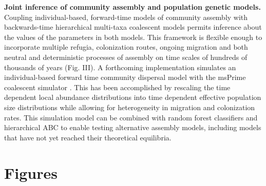 \documentclass[12pt]{article}
\begin{document}
{\begin{minipage}{0.97\textwidth}
    {\bf Joint inference of community assembly and population genetic
      models.} Coupling individual-based, forward-time models of
    community assembly with backwards-time hierarchical multi-taxa
    coalescent models permits inference about the values of the
    parameters in both models. This framework is flexible enough to
    incorporate multiple refugia, colonization routes, ongoing
    migration and both neutral and deterministic processes of assembly
    on time scales of hundreds of thousands of years (Fig. III). A
    forthcoming implementation \citep[gimmeSAD$\pi$][]{overcast}
    simulates an individual-based forward time community dispersal
    model \citep{rosindel} with the msPrime coalescent simulator
    \citep{msPrime}. This has been accomplished by rescaling the time
    dependent local abundance distributions into time dependent
    effective population size distributions while allowing for
    heterogeneity in migration and colonization rates. This simulation
    model can be combined with random forest classifiers and
    hierarchical ABC to enable testing alternative assembly models,
    including models that have not yet reached their theoretical
    equilibria.

  \end{minipage}
}

\pagebreak

\section*{Figures}
\end{document}
